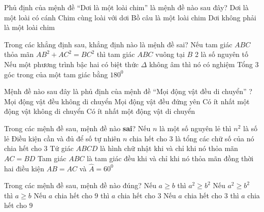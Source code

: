 \begin{ex}%
	Phủ định của mệnh đề “Dơi là một loài chim” là mệnh đề nào sau đây?
	\choice 
	{Dơi là một loài có cánh} 
	{Chim cùng loài với dơi} 
	{Bồ câu là một loài chim} 
	{\True Dơi không phải là một loài chim}
\end{ex} 
\begin{ex}%
	Trong các khẳng định sau, khẳng định nào là mệnh đề sai?
	\choice
	{\True Nếu tam giác $ABC$ thỏa mãn $AB^2+AC^2=BC^2$ thì tam giác $ABC$ vuông tại $B$}
	{2 là số nguyên tố}
	{Nếu một phương trình bậc hai có biệt thức $\Delta$ không âm thì nó có nghiệm}
	{Tổng $3$ góc trong của một tam giác bằng $180^0$} 
\end{ex}
\begin{ex}%
	Mệnh đề nào sau đây là phủ định của mệnh đề “Mọi động vật đều di chuyển” ?
	\choice 
	{ Mọi động vật đều không di chuyển} 
	{ Mọi động vật đều đứng yên} 
	{ \True Có ít nhất một động vật không di chuyển} 
	{ Có ít nhất một động vật di chuyển} 
\end{ex} 
\begin{ex}%
	Trong các mệnh đề sau, mệnh đề nào \textbf{sai}?
	\choice
	{Nếu $n$ là một số nguyên lẻ thì $n^2$ là số lẻ}
	{Điều kiện cần và đủ để số tự nhiên $n$ chia hết cho 3 là tổng các chữ số của nó chia hết cho $3$}
	{\True Tứ giác $ABCD$ là hình chữ nhật khi và chỉ khi nó thỏa mãn $AC=BD$}
	{Tam giác $ABC$ là tam giác đều khi và chỉ khi nó thỏa mãn đồng thời hai điều kiện $AB=AC$ và $\widehat{A}=60^0$} 
\end{ex}

\begin{ex}%
	Trong các mệnh đề sau, mệnh đề nào đúng?
	\choice
	{Nếu $a\ge b$ thì $a^2\ge b^2$}
	{Nếu $a^2 \ge b^2$ thì $a \ge b$}
	{\True Nếu $a$ chia hết cho $9$ thì $a$ chia hết cho $3$}
	{Nếu $a$ chia hết cho $3$ thì $a$ chia hết cho $9$}
\end{ex}

